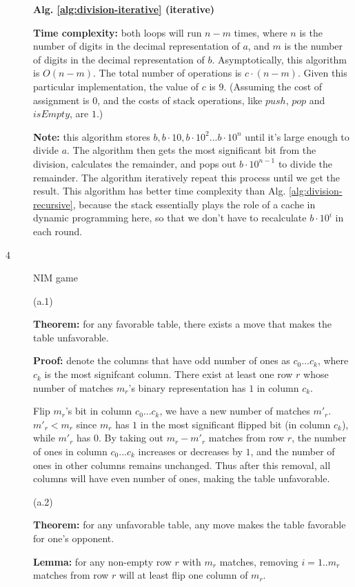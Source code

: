 \documentclass{article}
\begin{document}
\begin{description}
  \textbf{Alg. \ref{alg:division-iterative} (iterative)}

  \textbf{Time complexity:} both loops will run $n-m$ times, where $n$ is the number of digits in the decimal representation of $a$, and $m$ is the number of digits in the decimal representation of $b$. Asymptotically, this algorithm is $O(n-m)$. The total number of operations is $c \cdot (n-m)$. Given this particular implementation, the value of $c$ is $9$. (Assuming the cost of assignment is $0$, and the costs of stack operations, like $push$, $pop$ and $isEmpty$, are $1$.)

  \textbf{Note:} this algorithm stores $b, b \cdot 10, b \cdot 10^2...b \cdot 10^n$ until it's large enough to divide $a$. The algorithm then gets the most significant bit from the division, calculates the remainder, and pops out $b \cdot 10^{n-1}$ to divide the remainder. The algorithm iteratively repeat this process until we get the result. This algorithm has better time complexity than Alg. \ref{alg:division-recursive}, because the stack essentially plays the role of a cache in dynamic programming here, so that we don't have to recalculate $b \cdot 10^i$ in each round.

\item[4]{NIM game}

  (a.1) 

  \textbf{Theorem:} for any favorable table, there exists a move that makes the table unfavorable.

  \textbf{Proof:} denote the columns that have odd number of ones as $c_0...c_k$, where $c_k$ is the most signifcant column. There exist at least one row $r$ whose number of matches $m_r$'s binary representation has $1$ in column $c_k$.

  Flip $m_r$'s bit in column $c_0...c_k$, we have a new number of matches $m'_r$. $m'_r < m_r$ since $m_r$ has $1$ in the most significant flipped bit (in column $c_k$), while $m'_r$ has $0$. By taking out $m_r - m'_r$ matches from row $r$, the number of ones in column $c_0...c_k$ increases or decreases by $1$, and the number of ones in other columns remains unchanged. Thus after this removal, all columns will have even number of ones, making the table unfavorable.

  (a.2) 

  \textbf{Theorem:} for any unfavorable table, any move makes the table favorable for one's opponent.

  \textbf{Lemma:} for any non-empty row $r$ with $m_r$ matches, removing $i=1..m_r$ matches from row $r$ will at least flip one column of $m_r$. 


\end{description}
\end{document}
